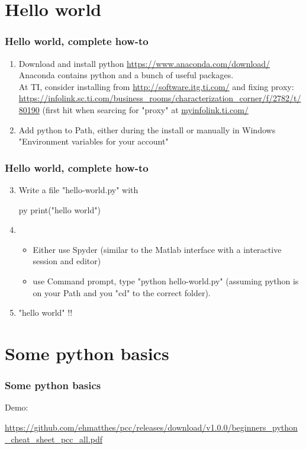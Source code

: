 \documentclass[12pt]{beamer}
\begin{document}
\section{Hello world}
\begin{frame}[fragile]
\frametitle{Hello world, complete how-to}
\begin{enumerate}
\item Download and install python
\url{https://www.anaconda.com/download/} \\
Anaconda contains python and a bunch of useful packages. \\
At TI, consider installing from \url{http://software.itg.ti.com/} and fixing proxy: \url{https://infolink.sc.ti.com/business_rooms/characterization_corner/f/2782/t/80190}
(first hit when searcing for "proxy" at \url{myinfolink.ti.com/}
\item Add python to Path, either during the install or manually in Windows "Environment variables for your account"
\end{enumerate}
\end{frame}

\begin{frame}[fragile]
\frametitle{Hello world, complete how-to}
\begin{enumerate}
\setcounter{enumi}{2}
\item Write a file "hello-world.py" with
\begin{pygments}{py}
print("hello world")
\end{pygments}
\item \begin{itemize}
\item  Either use Spyder (similar to the Matlab interface with a interactive session and editor)
\item use Command prompt, type "python hello-world.py" (assuming python is on your Path
and you "cd" to the correct folder).
\end{itemize}
\item "hello world" !!
\end{enumerate}
\end{frame}

\section{Some python basics}
\begin{frame}[fragile]
\frametitle{Some python basics}
Demo:\\ \begin{small}\url{https://github.com/ehmatthes/pcc/releases/download/v1.0.0/beginners_python_cheat_sheet_pcc_all.pdf}\end{small}
\end{frame}
\end{document}
